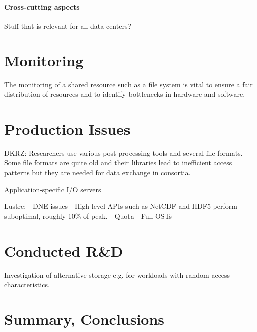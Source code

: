 \documentclass{superfri}
\numberwithin{equation}{section}
\begin{document}
\paragraph{Cross-cutting aspects}

Stuff that is relevant for all data centers?

\section{Monitoring}
\label{sec:monitoring}

The monitoring of a shared resource such as a file system is vital to ensure a fair distribution of resources and to identify bottlenecks in hardware and software.


\section{Production Issues}
\label{sec:issues}

DKRZ:
Researchers use various post-processing tools and several file formats.
Some file formats are quite old and their libraries lead to inefficient access patterns but they are needed for data exchange in consortia.

Application-specific I/O servers

Lustre:
- DNE issues
- High-level APIs such as NetCDF and HDF5 perform suboptimal, roughly 10\% of peak.
- Quota
- Full OSTs

\section{Conducted R\&D}
\label{sec:randd}

Investigation of alternative storage e.g. for workloads with random-access characteristics.

\section{Summary, Conclusions}
\label{sec:summary}




\end{document}
